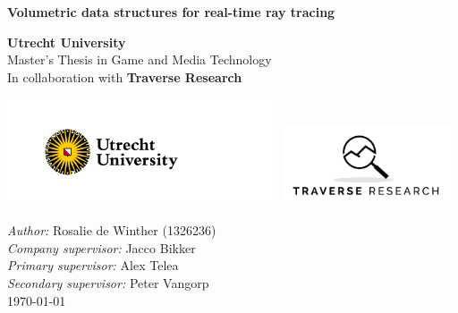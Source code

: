 \documentclass{article}
\begin{document}
\begin{titlepage}
    \begin{center}
        \vspace*{4cm}

        \hline
        \vspace{.5cm}
        \textbf{\huge Volumetric data structures for real-time ray tracing}
        \vspace{.5cm}
        \hline

        \vspace{1cm}



        \large \textbf{Utrecht University}\\
        Master's Thesis in Game and Media Technology\\
        \vspace{.5cm}
        \large In collaboration with \textbf{Traverse Research}


        \vspace{6cm}

        \includegraphics[width = 8cm]{figures/UU_logo_2021_EN_RGB.png}
        \hfill
        \includegraphics[width = 5cm]{figures/Traverse+Research+Cropped.png}

        \vspace{1cm}

        \raggedright \textit{Author:} Rosalie de Winther (1326236)\\
        \textit{Company supervisor:} Jacco Bikker\\
        \textit{Primary supervisor:} Alex Telea\\
        \textit{Secondary supervisor:} Peter Vangorp\\
        \today

    \end{center}
\end{titlepage}



\clearpage

\clearpage

\clearpage
\tableofcontents
\clearpage

\clearpage

\clearpage

\clearpage

\clearpage

\clearpage

\clearpage

\clearpage




\end{document}
